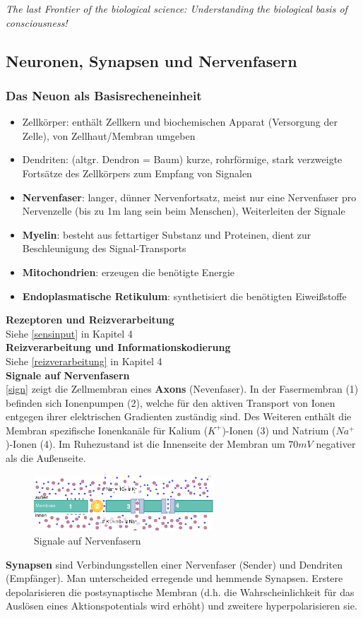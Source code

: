 \emph{The last Frontier of the biological science: Understanding the biological basis of consciousness!}
\subsection{Neuronen, Synapsen und Nervenfasern}
\subsubsection{Das Neuon als Basisrecheneinheit}
\begin{itemize}
\item Zellkörper: enthält Zellkern und biochemischen Apparat (Versorgung der Zelle), von Zellhaut/Membran umgeben
\item Dendriten: (altgr. Dendron = \glqq Baum\grqq) kurze, rohrförmige, stark verzweigte Fortsätze des Zellkörpers zum Empfang von Signalen
\item \textbf{Nervenfaser}: langer, dünner Nervenfortsatz, meist nur eine Nervenfaser pro
Nervenzelle (bis zu 1m lang sein beim
Menschen), Weiterleiten der Signale
\item \textbf{Myelin}: besteht aus fettartiger Substanz und Proteinen,
dient zur Beschleunigung des Signal-Transports
\item \textbf{Mitochondrien}: erzeugen die benötigte Energie
\item \textbf{Endoplasmatische Retikulum}: synthetisiert die benötigten Eiweißstoffe
\end{itemize}
\textbf{Rezeptoren und Reizverarbeitung}\\
Siehe \autoref{sensinput} in Kapitel 4\\
\textbf{Reizverarbeitung und Informationskodierung}\\
Siehe \autoref{reizverarbeitung} in Kapitel 4\\
\noindent
\textbf{Signale auf Nervenfasern}\\
\autoref{sign} zeigt die Zellmembran eines \textbf{Axons} (Nevenfaser). In der Fasermembran (1) befinden sich Ionenpumpen (2), welche für den aktiven Transport von Ionen entgegen ihrer elektrischen Gradienten zuständig sind. Des Weiteren enthält die Membran spezifische Ionenkanäle für Kalium ($K^+$)-Ionen (3) und Natrium ($Na^+$)-Ionen (4). Im Ruhezustand ist die Innenseite der Membran um $70mV$ negativer als die Außenseite.
\begin{figure}[h!]
	\centering
	\includegraphics[width=0.6\textwidth]{figures/ch07_signale.png}
	\caption{Signale auf Nervenfasern}
	\label{sign}
\end{figure}
\noindent
\textbf{Synapsen} sind Verbindungsstellen einer Nervenfaser (Sender) und Dendriten (Empfänger). Man unterscheided erregende und hemmende Synapsen. Erstere depolarisieren die postsynaptische Membran (d.h. die Wahrscheinlichkeit für das Auslösen eines Aktionspotentials wird erhöht) und zweitere hyperpolarisieren sie.
